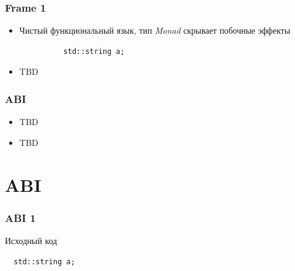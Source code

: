 \documentclass{beamer}
\begin{document}
\begin{frame}[fragile]
\frametitle{Frame 1}
\begin{itemize}
\item<+-> Чистый функциональный язык, тип \emph{Monad} скрывает побочные эффекты
        \begin{verbatim}
          std::string a;
        \end{verbatim}
\item<+-> TBD
\end{itemize}
\end{frame}

\begin{frame}[fragile]
\frametitle{ABI}
\begin{itemize}
\item<+-> TBD
\item<+-> TBD
\end{itemize}
\end{frame}

\section{ABI}

\begin{frame}[fragile]
\frametitle{ABI 1}
Исходный код 
\begin{verbatim}
  std::string a;
\end{verbatim}
\end{frame}
\end{document}
